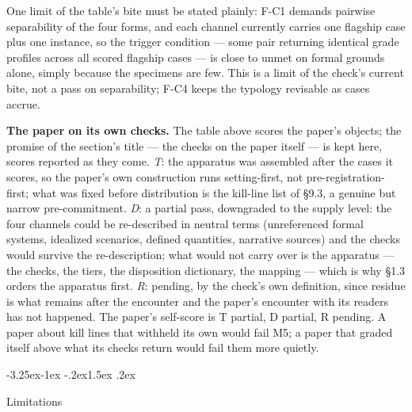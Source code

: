 \documentclass[11pt,a4paper]{article}
\makeatletter
\renewcommand\subsection{\@startsection{subsection}{2}{\z@}%
  {-3.25ex\@plus -1ex \@minus -.2ex}{1.5ex \@plus .2ex}%
  {\normalfont\large\bfseries\raggedright}}
\makeatother
\begin{document}
One limit of the table's bite must be stated plainly: F-C1 demands pairwise separability of the four forms, and each channel currently carries one flagship case plus one instance, so the trigger condition — some pair returning identical grade profiles across all scored flagship cases — is close to unmet on formal grounds alone, simply because the specimens are few. This is a limit of the check's current bite, not a pass on separability; F-C4 keeps the typology revisable as cases accrue.

\textbf{The paper on its own checks.} The table above scores the paper's objects; the promise of the section's title — the checks on the paper itself — is kept here, scores reported as they come. \textit{T}: the apparatus was assembled after the cases it scores, so the paper's own construction runs setting-first, not pre-registration-first; what was fixed before distribution is the kill-line list of §9.3, a genuine but narrow pre-commitment. \textit{D}: a partial pass, downgraded to the supply level: the four channels could be re-described in neutral terms (unreferenced formal systems, idealized scenarios, defined quantities, narrative sources) and the checks would survive the re-description; what would not carry over is the apparatus — the checks, the tiers, the disposition dictionary, the mapping — which is why §1.3 orders the apparatus first. \textit{R}: pending, by the check's own definition, since residue is what remains after the encounter and the paper's encounter with its readers has not happened. The paper's self-score is T partial, D partial, R pending. A paper about kill lines that withheld its own would fail M5; a paper that graded itself above what its checks return would fail them more quietly.

\subsection{Limitations}
\end{document}
